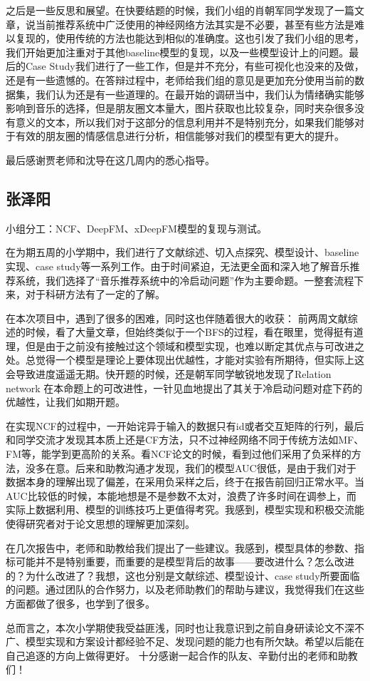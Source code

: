 之后是一些反思和展望。在快要结题的时候，我们小组的肖朝军同学发现了一篇文章，说当前推荐系统中广泛使用的神经网络方法其实是不必要，甚至有些方法是难以复现的，使用传统的方法也能达到相似的准确度。这也引发了我们小组的思考，我们开始更加注重对于其他baseline模型的复现，以及一些模型设计上的问题。最后的Case Study我们进行了一些工作，但是并不充分，有些可视化也没来的及做，还是有一些遗憾的。在答辩过程中，老师给我们组的意见是更加充分使用当前的数据集，我们认为还是有一些道理的。在最开始的调研当中，我们认为情绪确实能够影响到音乐的选择，但是朋友圈文本量大，图片获取也比较复杂，同时夹杂很多没有意义的文本，所以我们对于这部分的信息利用并不是特别充分，如果我们能够对于有效的朋友圈的情感信息进行分析，相信能够对我们的模型有更大的提升。

最后感谢贾老师和沈导在这几周内的悉心指导。

\subsection{张泽阳}
小组分工：NCF、DeepFM、xDeepFM模型的复现与测试。

在为期五周的小学期中，我们进行了文献综述、切入点探究、模型设计、baseline实现、case study等一系列工作。由于时间紧迫，无法更全面和深入地了解音乐推荐系统，我们选择了“音乐推荐系统中的冷启动问题”作为主要命题。一整套流程下来，对于科研方法有了一定的了解。

在本次项目中，遇到了很多的困难，同时这也伴随着很大的收获：
前两周文献综述的时候，看了大量文章，但始终类似于一个BFS的过程，看在眼里，觉得挺有道理，但是由于之前没有接触过这个领域和模型实现，也难以断定其优点与可改进之处。总觉得一个模型是理论上要体现出优越性，才能对实验有所期待，但实际上这会导致进度遥遥无期。快开题的时候，还是朝军同学敏锐地发现了Relation network 在本命题上的可改进性，一针见血地提出了其关于冷启动问题对症下药的优越性，让我们如期开题。

在实现NCF的过程中，一开始诧异于输入的数据只有id或者交互矩阵的行列，最后和同学交流才发现其本质上还是CF方法，只不过神经网络不同于传统方法如MF、FM等，能学到更高阶的关系。看NCF论文的时候，看到过他们采用了负采样的方法，没多在意。后来和助教沟通才发现，我们的模型AUC很低，是由于我们对于数据本身的理解出现了偏差，在采用负采样之后，终于在报告前回归正常水平。当AUC比较低的时候，本能地想是不是参数不太对，浪费了许多时间在调参上，而实际上数据利用、模型的训练技巧上更值得考究。我感到，模型实现和积极交流能使得研究者对于论文思想的理解更加深刻。

在几次报告中，老师和助教给我们提出了一些建议。我感到，模型具体的参数、指标可能并不是特别重要，而重要的是模型背后的故事——要改进什么？怎么改进的？为什么改进了？我想，这也分别是文献综述、模型设计、case study所要面临的问题。通过团队的合作努力，以及老师助教们的帮助与建议，我觉得我们在这些方面都做了很多，也学到了很多。

总而言之，本次小学期使我受益匪浅，同时也让我意识到之前自身研读论文不深不广、模型实现和方案设计都经验不足、发现问题的能力也有所欠缺。希望以后能在自己追逐的方向上做得更好。
十分感谢一起合作的队友、辛勤付出的老师和助教们！
